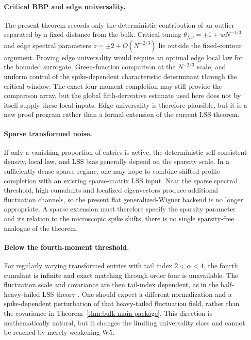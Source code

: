 \documentclass[10pt,a4paper]{amsart}
\begin{document}
\paragraph*{Critical BBP and edge universality.}
The present theorem records only the deterministic contribution of an outlier
separated by a fixed distance from the bulk.  Critical tuning
\(\theta_{f,\nu}=\pm1+wN^{-1/3}\) and edge spectral parameters
\(z=\pm2+O(N^{-2/3})\) lie outside the fixed-contour argument.  Proving edge
universality would require an optimal edge local law for the bounded
surrogate, Green-function comparison at the $N^{-2/3}$ scale, and uniform
control of the spike-dependent characteristic determinant through the
critical window.  The exact four-moment completion may still provide the
comparison array, but the global fifth-derivative estimate used here does not
by itself supply these local inputs.  Edge universality is therefore
plausible, but it is a new proof program rather than a formal extension of the
current LSS theorem.

\paragraph*{Sparse transformed noise.}
If only a vanishing proportion of entries is active, the deterministic
self-consistent density, local law, and LSS bias generally depend on the
sparsity scale.  In a sufficiently dense sparse regime, one may hope to
combine shifted-profile completion with an existing sparse-matrix LSS input.
Near the sparse spectral threshold, high cumulants and localized eigenvectors
produce additional fluctuation channels, so the present flat
generalized-Wigner backend is no longer appropriate.  A sparse extension must
therefore specify the sparsity parameter and its relation to the microscopic
spike shifts; there is no single sparsity-free analogue of the theorem.

\paragraph*{Below the fourth-moment threshold.}
For regularly varying transformed entries with tail index
\(2<\alpha<4\), the fourth cumulant is infinite and exact matching through
order four is unavailable.  The fluctuation scale and covariance are then
tail-index dependent, as in the half-heavy-tailed LSS theory
\cite{BenaychGeorgesMaltsev2016,LodhiaMaltsev2023}.  One should expect a
different normalization and a spike-dependent perturbation of that
heavy-tailed fluctuation field, rather than the covariance in
Theorem~\ref{thm:bulk-main-package}.  This direction is mathematically
natural, but it changes the limiting universality class and cannot be reached
by merely weakening W5.
\end{document}
